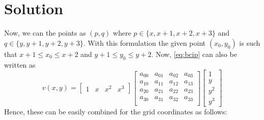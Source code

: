 \documentclass[a4paper, landscape]{article}
\begin{document}
\section{Solution}
Now, we can the points as $(p,q)$ where $p\in\{x,x+1,x+2,x+3\}$ and $q\in\{y,y+1,y+2,y+3\}$. With this formulation the given point $(x_0,y_0)$ is such that $x+1\leq x_0\leq x+2$ and $y+1\leq y_0\leq y+2$. Now, \ref{eq:bcip} can also be written as
\begin{equation}
    v(x,y)=\begin{bmatrix}
        1 & x & x^2 & x^3
    \end{bmatrix}
    \begin{bmatrix}
        a_{00} & a_{01} & a_{02} & a_{03}\\
        a_{10} & a_{11} & a_{12} & a_{13}\\
        a_{20} & a_{21} & a_{22} & a_{23}\\
        a_{30} & a_{31} & a_{32} & a_{33}\\
    \end{bmatrix}
    \begin{bmatrix}
        1 \\ y \\y^2 \\ y^3
    \end{bmatrix}
\end{equation}
Hence, these can be easily combined for the grid coordinates as follows:
\end{document}
